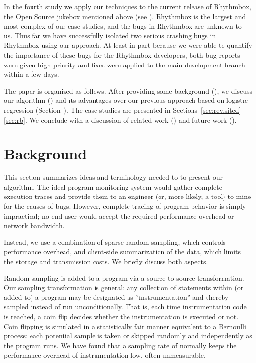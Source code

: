 \documentclass{sig-alternate}
\begin{document}
In the fourth study we apply our techniques to the current release
of Rhythmbox, the Open Source jukebox mentioned above (see
).  Rhythmbox is the largest and most complex of our
case studies, and the bugs in Rhythmbox are unknown to us.  Thus far
we have successfully isolated two serious crashing bugs in Rhythmbox
using our approach.  At least in part because we were able to
quantify the importance of these bugs for the Rhythmbox developers, both
bug reports were given high priority and fixes were applied to the
main development branch within a few days.


The paper is organized as follows.  After providing some background
(), we discuss our algorithm
() and its advantages over our previous approach
based on logistic regression (Section~\cite{sec:comparison}).  The case studies
are presented in Sections~\ref{sec:revisited}-\ref{sec:rb}.  We conclude with a
discussion of related work () and future
work (). 

\section{Background}
\label{sec:background}

This section summarizes ideas and terminology needed to to present our
algorithm.  The ideal program monitoring system would gather complete
execution traces and provide them to an engineer (or, more likely, a
tool) to mine for the causes of bugs.  However, complete tracing of
program behavior is simply impractical; no end user would accept the
required performance overhead or network bandwidth.

Instead, we use a combination of sparse random sampling, which controls
performance overhead, and client-side summarization of the data, which
limits the storage and transmission costs.  We briefly discuss
both aspects.

Random sampling is added to a program via a source-to-source transformation.
Our sampling transformation is general: any collection of
statements within (or added to) a program may be designated as
``instrumentation'' and thereby sampled instead of run
unconditionally.  That is, each time instrumentation code is reached,
a coin flip decides whether the instrumentation is executed or not.
Coin flipping is simulated in a statistically fair
manner equivalent to a Bernoulli process: each potential sample is
taken or skipped randomly and independently as the program runs.
We have found that a sampling rate of  normally keeps the performance overhead
of instrumentation low, often unmeasurable.
\end{document}
